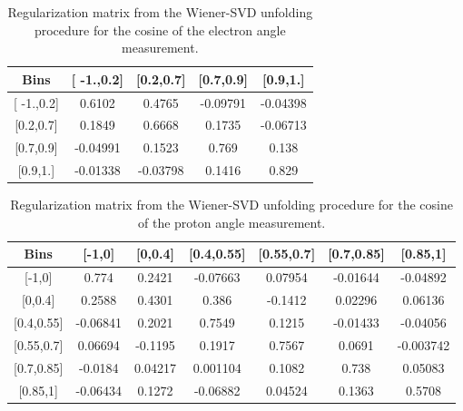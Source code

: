 \documentclass[amsmath,amssymb,aps,prd,showpacs,twocolumn,superscriptaddress,letterpaper,longbibliography, floatfix]{revtex4-2}
\begin{document}
\FloatBarrier
\begin{table}[H]
\caption{Regularization matrix from the Wiener-SVD unfolding procedure for the cosine of the electron angle measurement.} \label{tbl:ACAe}
\begin{center} \begin{tabular}{|c|c|c|c|c|}
\hline
Bins & [ -1.,0.2] & [0.2,0.7]& [0.7,0.9]& [0.9,1.]\\\hline
{[ -1.,0.2]} & 0.6102&0.4765	&-0.09791	&-0.04398 \\
{[0.2,0.7]}  &0.1849& 0.6668&0.1735 & -0.06713   \\
{[0.7,0.9]}  &-0.04991&0.1523 &0.769& 0.138  \\
{[0.9,1.]}  &-0.01338& -0.03798& 0.1416& 0.829  \\
\hline
\end{tabular} \end{center}
\end{table}
\FloatBarrier
\begin{table}[H]
\caption{Regularization matrix from the Wiener-SVD unfolding procedure for the cosine of the proton angle measurement.} \label{tbl:ACAp}
\begin{center} \begin{tabular}{|c|c|c|c|c|c|c|}
\hline
Bins & [-1,0] & [0,0.4]& [0.4,0.55]& [0.55,0.7]& [0.7,0.85]& [0.85,1]\\\hline
{[-1,0]} & 0.774&0.2421	&-0.07663	&0.07954	& -0.01644 	&-0.04892 \\
{[0,0.4]}   &0.2588&0.4301 &0.386 &-0.1412 &0.02296 & 0.06136 \\
{[0.4,0.55]}  & -0.06841&0.2021 & 0.7549&0.1215 & -0.01433&-0.04056  \\
{[0.55,0.7]}  &0.06694& -0.1195& 0.1917& 0.7567& 0.0691&-0.003742  \\
{[0.7,0.85]}  &-0.0184& 0.04217& 0.001104&0.1082 & 0.738& 0.05083\\
{[0.85,1]}  &-0.06434& 0.1272& -0.06882&0.04524 &0.1363 &0.5708 \\

\hline
\end{tabular} \end{center}
\end{table}
\end{document}
